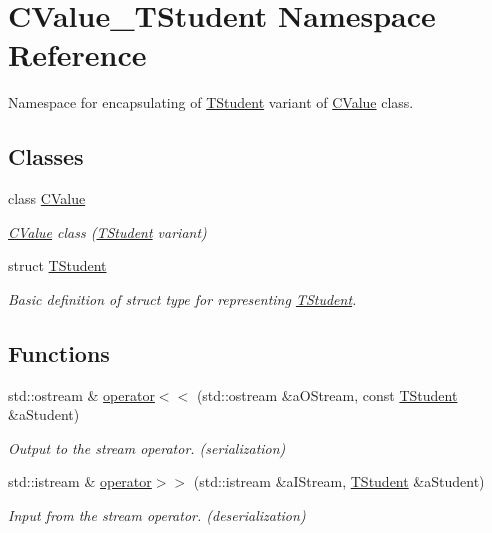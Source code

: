 \hypertarget{namespace_c_value___t_student}{}\section{C\+Value\+\_\+\+T\+Student Namespace Reference}
\label{namespace_c_value___t_student}


Namespace for encapsulating of {\ttfamily \hyperlink{struct_c_value___t_student_1_1_t_student}{T\+Student}} variant of \hyperlink{class_c_value___t_student_1_1_c_value}{C\+Value} class.  


\subsection*{Classes}
\begin{DoxyCompactItemize}
\item 
class \hyperlink{class_c_value___t_student_1_1_c_value}{C\+Value}
\begin{DoxyCompactList}\small\item\em \hyperlink{class_c_value___t_student_1_1_c_value}{C\+Value} class ({\ttfamily \hyperlink{struct_c_value___t_student_1_1_t_student}{T\+Student}} variant) \end{DoxyCompactList}\item 
struct \hyperlink{struct_c_value___t_student_1_1_t_student}{T\+Student}
\begin{DoxyCompactList}\small\item\em Basic definition of struct type for representing \hyperlink{struct_c_value___t_student_1_1_t_student}{T\+Student}. \end{DoxyCompactList}\end{DoxyCompactItemize}
\subsection*{Functions}
\begin{DoxyCompactItemize}
\item 
std\+::ostream \& \hyperlink{namespace_c_value___t_student_a74d67e5f2ecbfee96605b87464c628ca}{operator$<$$<$} (std\+::ostream \&a\+O\+Stream, const \hyperlink{struct_c_value___t_student_1_1_t_student}{T\+Student} \&a\+Student)
\begin{DoxyCompactList}\small\item\em Output to the stream operator. ({\itshape serialization}) \end{DoxyCompactList}\item 
std\+::istream \& \hyperlink{namespace_c_value___t_student_a7cef4a5db96e988bb59a53168f90363f}{operator$>$$>$} (std\+::istream \&a\+I\+Stream, \hyperlink{struct_c_value___t_student_1_1_t_student}{T\+Student} \&a\+Student)
\begin{DoxyCompactList}\small\item\em Input from the stream operator. ({\itshape deserialization}) \end{DoxyCompactList}\end{DoxyCompactItemize}


